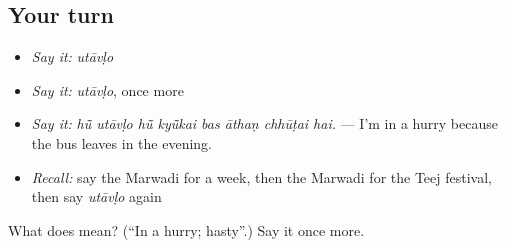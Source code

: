 \subsection*{Your turn}
\begin{itemize}
\raggedright
  \item \emph{Say it:} \emph{utāvḷo}
  \item \emph{Say it:} \emph{utāvḷo}, once more
  \item \emph{Say it:} \emph{hū̃ utāvḷo hū̃ kyū̃kai bas āthaṇ chhūṭai hai.} — I'm in a hurry because the bus leaves in the evening.
  \item \emph{Recall:} say the Marwadi for a week, then the Marwadi for the Teej festival, then say \emph{utāvḷo} again
\end{itemize}

\begin{tcolorbox}[breakable,colback=teal!4,colframe=teal!35!black,title={Before you move on}]
What does  mean? (\textquotedblleft{}In a hurry; hasty\textquotedblright{}.) Say it once more.
\end{tcolorbox}
